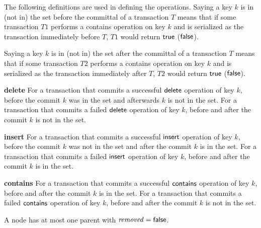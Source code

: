 The following definitions are used in defining the operations.
Saying a key $k$ is in (not in) the set before the committal of a transaction $T$ means that if some transaction $T1$ performs a contains operation on key $k$
and is serialized as the transaction immediately before $T$, $T1$ would return $\lit{true}$ ($\lit{false}$).

Saying a key $k$ is in (not in) the set after the committal of a transaction $T$ means that if some transaction $T2$ performs a contains operation on key $k$
and is serialized as the transaction immediately after $T$, $T2$ would return $\lit{true}$ ($\lit{false}$).

{\bf delete} For a transaction that commits a successful $\act{delete}$ operation of key $k$, before the commit $k$ was in the set
and afterwards $k$ is not in the set.
For a transaction that commits a failed $\act{delete}$ operation of key $k$, before and after the commit $k$ is not in the set.

{\bf insert} For a transaction that commits a successful $\act{insert}$ operation of key $k$, before the commit $k$ was not in the set and after the commit $k$ is in the set.
For a transaction that commits a failed $\act{insert}$ operation of key $k$, before and after the commit $k$ is in the set.

{\bf contains} For a transaction that commits a successful $\act{contains}$ operation of key $k$, before and after the commit $k$ is in the set.
For a transaction that commits a failed $\act{contains}$ operation of key $k$, before and after the commit $k$ is not in the set.



\begin{lemma}
\label{lemma:1-rem}
A node has at most one parent with $\ms{removed} = \lit{false}$.
\end{lemma}

